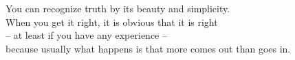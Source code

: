 \documentclass[preview]{standalone}
\begin{document}
\begin{flushleft}
You can recognize truth by its beauty and simplicity.\\When you get it right, it is obvious that it is right\\– at least if you have any experience –\\because usually what happens is that more comes out than goes in.
\end{flushleft}
\end{document}
